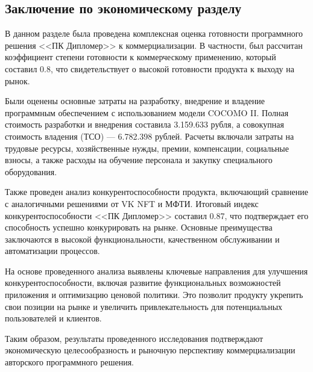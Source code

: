 \subsection{Заключение по экономическому разделу}

В данном разделе была проведена комплексная оценка готовности программного решения <<ПК Дипломер>> к коммерциализации. В частности, был рассчитан коэффициент степени готовности к коммерческому применению, который составил 0.8, что свидетельствует о высокой готовности продукта к выходу на рынок.

Были оценены основные затраты на разработку, внедрение и владение программным обеспечением с использованием модели COCOMO II. Полная стоимость разработки и внедрения составила 3.159.633 рубля, а совокупная стоимость владения (ТСО) --- 6.782.398 рублей. Расчеты включали затраты на трудовые ресурсы, хозяйственные нужды, премии, компенсации, социальные взносы, а также расходы на обучение персонала и закупку специального оборудования.

Также проведен анализ конкурентоспособности продукта, включающий сравнение с аналогичными решениями от VK NFT и МФТИ. Итоговый индекс конкурентоспособности <<ПК Дипломер>> составил 0.87, что подтверждает его способность успешно конкурировать на рынке. Основные преимущества заключаются в высокой функциональности, качественном обслуживании и автоматизации процессов.

На основе проведенного анализа выявлены ключевые направления для улучшения конкурентоспособности, включая развитие функциональных возможностей приложения и оптимизацию ценовой политики. Это позволит продукту укрепить свои позиции на рынке и увеличить привлекательность для потенциальных пользователей и клиентов.

Таким образом, результаты проведенного исследования подтверждают экономическую целесообразность и рыночную перспективу коммерциализации авторского программного решения.